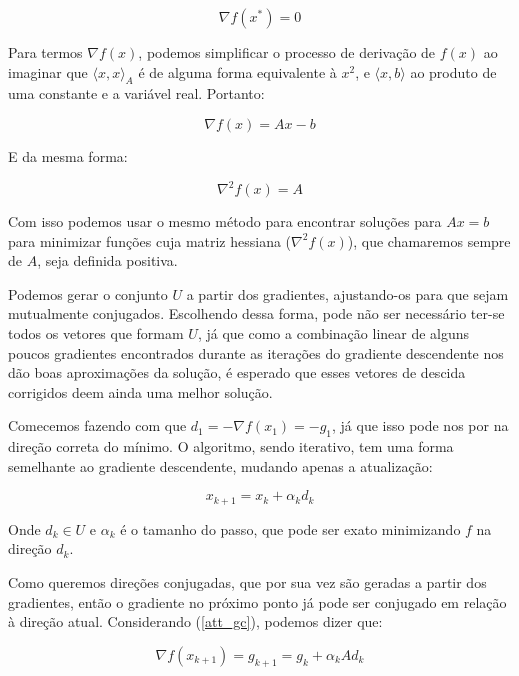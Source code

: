 \begin{equation}
\nabla f(x^*) = 0
\end{equation}

Para termos \(\nabla f(x)\), podemos simplificar o processo de derivação de \(f(x)\) ao imaginar
que \(\langle x, x \rangle_A\) é de alguma forma equivalente à \(x^2\), e \(\langle x, b \rangle\)
ao produto de uma constante e a variável real. Portanto:

\begin{equation}
\nabla f(x) = Ax - b
\end{equation}

E da mesma forma:

\begin{equation*}
\nabla^2 f(x) = A
\end{equation*}

Com isso podemos usar o mesmo método para encontrar soluções para \(Ax = b\) para
minimizar funções cuja matriz hessiana (\(\nabla^2 f(x)\)), que chamaremos sempre de \(A\),
seja definida positiva.

Podemos gerar o conjunto \(U\) a partir dos gradientes, ajustando-os para que sejam
mutualmente conjugados. Escolhendo dessa forma, pode não ser necessário ter-se todos os
vetores que formam \(U\), já que como a combinação linear de alguns poucos gradientes
encontrados durante as iterações do gradiente descendente nos dão boas aproximações da
solução, é esperado que esses vetores de descida corrigidos deem ainda uma melhor
solução.

Comecemos fazendo com que \(d_1 = -\nabla f(x_1) = -g_1 \), já que isso pode nos por na
direção correta do mínimo. O algoritmo, sendo iterativo, tem uma forma semelhante ao
gradiente descendente, mudando apenas a atualização:

\begin{equation}
\label{att_gc}
x_{k+1} = x_k + \alpha_k d_k
\end{equation}

Onde \(d_k \in U\) e \(\alpha_k\) é o tamanho do passo, que pode ser exato minimizando
\(f\) na direção \(d_k\).

Como queremos direções conjugadas, que por sua vez são geradas a partir dos gradientes,
então o gradiente no próximo ponto já pode ser conjugado em relação à direção atual.
Considerando (\ref{att_gc}), podemos dizer que:

\begin{equation}
  \label{def_gc_gk1}
  \nabla f(x_{k+1}) = g_{k+1} = g_k + \alpha_k Ad_k
\end{equation}

